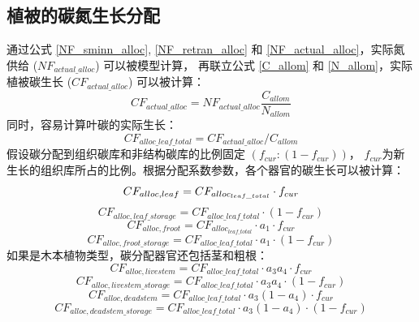\subsection{植被的碳氮生长分配}\label{植被的碳氮生长分配}
通过公式 \eqref{NF_sminn_alloc}, \eqref{NF_retran_alloc} 和 \eqref{NF_actual_alloc}，实际氮供给 ($NF_{actual\_alloc}$) 可以被模型计算，
再联立公式 \eqref{C_allom} 和 \eqref{N_allom}，实际植被碳生长 ($CF_{actual\_alloc}$) 可以被计算：
\begin{equation}
  CF_{actual\_alloc} = NF_{actual\_alloc}\frac{C_{allom}}{N_{allom}}
\end{equation}
同时，容易计算叶碳的实际生长：
\begin{equation}
  CF_{alloc\_leaf\_total} = CF_{actual\_alloc}/C_{allom}
\end{equation}
假设碳分配到组织碳库和非结构碳库的比例固定 $\left(f_{cur}:\left(1-f_{cur}\right)\right)$，
$f_{cur}$为新生长的组织库所占的比例。根据分配系数参数，各个器官的碳生长可以被计算：
\begin{equation}\label{CF_alloc_{leaf}}
  CF_{alloc,leaf} = CF_{alloc_{leaf\_total}}\cdot  f_{cur}
\end{equation}
\begin{equation}
  CF_{alloc,leaf\_storage} = CF_{alloc\_leaf\_total}\cdot \left(1-f_{cur}\right)
\end{equation}
\begin{equation}
  CF_{alloc,froot} = CF_{alloc_{leaf\_total}}\cdot a_1\cdot f_{cur}
\end{equation}
\begin{equation}
  CF_{alloc,{froot\_storage}} = CF_{alloc\_leaf\_total}\cdot a_1\cdot \left(1-f_{cur}\right)
\end{equation}
如果是木本植物类型，碳分配器官还包括茎和粗根：
\begin{equation}
  CF_{alloc,livestem} = CF_{alloc\_leaf\_total}\cdot a_3a_4\cdot f_{cur}
\end{equation}
\begin{equation}
  CF_{alloc,livestem\_storage} = CF_{alloc\_leaf\_total}\cdot a_3a_4\cdot \left(1-f_{cur}\right)
\end{equation}
\begin{equation}
  CF_{alloc,deadstem} = CF_{alloc\_leaf\_total}\cdot a_3\left(1-a_4\right)\cdot f_{cur}
\end{equation}
\begin{equation}
  CF_{alloc,deadstem\_storage} = CF_{alloc\_leaf\_total}\cdot a_3\left(1-a_4\right)\cdot \left(1-f_{cur}\right)
\end{equation}
